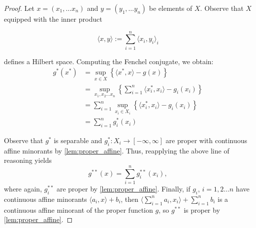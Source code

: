 \documentclass[11pt]{article}
\begin{document}
	\begin{proof}
		Let $x = (x_1, \ldots x_n)$ and $y = (y_1, \ldots y_n)$ be elements of $X$. Observe that $X$ equipped with the inner product 
		
		\[	\langle x, y\rangle := \sum_{i=1}^{n} \langle x_{i}, y_{i}\rangle_{i}
				\]
				
		\noindent defines a Hilbert space. 	Computing the Fenchel conjugate, we obtain:
		\begin{align*}
			g^{*}(x^{*}) 
			& = \sup_{x\in X}\left\{ 
									\langle x^*, x\rangle - g(x)
												\right\} \\
			& = \sup_{x_1,x_2\ldots x_n} \left\{
										\sum_{i=1}^{n} \langle x^{*}_{i}, x_i\rangle - g_{i}(x_i)
												\right\}	\\
			& = \sum_{i=1}^{n}	\sup_{x_i\in X_i} \left\{\langle x^{*}_{i}, x_i\rangle - g_{i}(x_i)\right\} \\
			& = \sum_{i=1}^{n} g_{i}^{*}(x_i)					
			\end{align*}
			
			\noindent Observe that $g^{*}$ is separable and $g_{i}^{*}:X_{i}\to[-\infty, \infty]$ are proper with continuous affine minorants by \autoref{lem:proper_affine}. Thus, reapplying the above line of reasoning yields 
			\[	g^{**}(x) = \sum_{i=1}^{n} g_{i}^{**}(x_i),
			\]
			where again, $g^{**}_{i}$ are proper by \autoref{lem:proper_affine}. Finally, if $g_{i}$, $i=1,2\ldots n$ have continuous affine minorants $\langle a_{i}, x\rangle + b_{i}$, then $\langle \sum_{i=1}^{n}a_i, x_i\rangle + \sum_{i=1}^{n} b_{i}$ is a continuous affine minorant of the proper function $g$, so $g^{**}$ is proper by \autoref{lem:proper_affine}.
		\end{proof}
\end{document}
